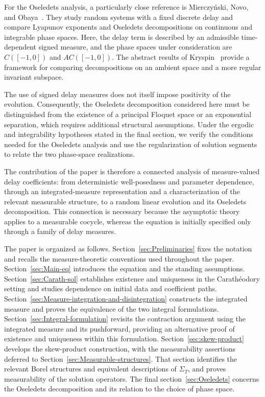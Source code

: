 \documentclass[reqno]{amsart}
\theoremstyle{plain}
\numberwithin{equation}{section}
\numberwithin{definition}{section}
\begin{document}
For the Oseledets analysis, a particularly close
reference is Mierczy\'nski, Novo, and
Obaya~\cite{MierczynskiNovoObaya2020}.
They study random systems with a fixed discrete delay
and compare Lyapunov exponents and Oseledets
decompositions on continuous and integrable phase
spaces. Here, the delay term is described by an
admissible time-dependent signed measure, and the
phase spaces under consideration are
$C([-1,0])$ and $AC([-1,0])$.
The abstract results of
Kryspin~\cite{Kryspin2024} provide a framework
for comparing decompositions on an ambient space
and a more regular invariant subspace.

The use of signed delay measures does not itself
impose positivity of the evolution.
Consequently, the Oseledets decomposition considered
here must be distinguished from the existence of
a principal Floquet space or an exponential separation,
which requires additional structural assumptions.
Under the ergodic and integrability hypotheses stated
in the final section, we verify the conditions needed
for the Oseledets analysis and use the regularization
of solution segments to relate the two phase-space
realizations.

The contribution of the paper is therefore a connected
analysis of measure-valued delay coefficients:
from deterministic well-posedness and parameter
dependence, through an integrated-measure representation
and a characterization of the relevant measurable
structure, to a random linear evolution and its
Oseledets decomposition.
This connection is necessary because the asymptotic
theory applies to a measurable cocycle, whereas
the equation is initially specified only through
a family of delay measures.

The paper is organized as follows. Section~\ref{sec:Preliminaries} fixes the notation and recalls the
measure-theoretic conventions used throughout the paper.
Section~\ref{sec:Main-eq} introduces the equation and the standing
assumptions.
Section~\ref{sec:Carath-sol} establishes existence and uniqueness in the \allowbreak
Carath\'eodory setting and studies dependence on initial
data and coefficient paths.
Section~\ref{sec:Measure-integration-and-disintegration} constructs the integrated measure and proves
the equivalence of the two integral formulations. Section~\ref{sec:Integral-formulation} revisits the contraction argument using the integrated measure
and its pushforward, providing an alternative proof of existence and
uniqueness within this formulation.
Section~\ref{sec:skew-product} develops the skew-product construction,
with the measurability assertions deferred to
Section~\ref{sec:Measurable-structures}.
That section identifies the relevant Borel structures
and equivalent descriptions of $\Sigma_T$, and proves
measurability of the solution operators.
The final section~\ref{sec:Oseledets} concerns the Oseledets decomposition
and its relation to the choice of phase space.
\end{document}
